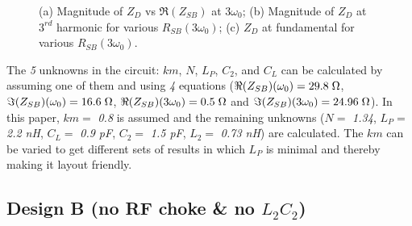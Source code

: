 \documentclass[conference]{IEEEtran}
\begin{document}
\begin{figure}[!t]
\begin{subfigure}{0.4\textwidth}
\caption{}
\label{fig:Design_A_Rn_var_1H}
\end{subfigure}
\caption{(a) Magnitude of $Z_{D}$ vs $\Re(Z_{SB})$ at $3\omega_0$; (b) Magnitude of $Z_D$ at $3^{rd}$ harmonic for various $R_{SB}(3\omega_0)$; (c) $Z_D$ at fundamental for various $R_{SB}(3\omega_0)$.}
\label{fig:Design_A_Rn_var}
\vspace{-0.2in}
\end{figure}

The \textit{5} unknowns in the circuit: $km$, $N$, $L_P$, $C_2$, and $C_L$ can be calculated by assuming one of them and using \textit{4} equations ($\Re(Z_{SB})(\omega_0) =  29.8\hspace{1mm} \Omega$, $\Im(Z_{SB})(\omega_0) = 16.6\hspace{1mm}\Omega$, $\Re(Z_{SB})(3\omega_0) = 0.5\hspace{1mm}\Omega$ and  $\Im(Z_{SB})(3\omega_0) = 24.96\hspace{1mm}\Omega$). In this paper, $km =$ \textit{0.8} is assumed and the remaining unknowns ($N =$ \textit{1.34}, $L_P =$ \textit{2.2 nH}, $C_L =$ \textit{0.9 pF}, $C_2 =$ \textit{1.5 pF}, $L_2 =$ \textit{0.73 nH}) are calculated. The $km$ can be varied to get different sets of results in which $L_P$ is minimal and thereby making it layout friendly.


\subsection{Design B (no RF choke \& no $L_2C_2$)}
\end{document}
